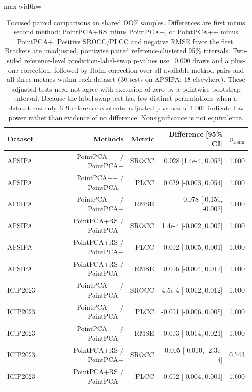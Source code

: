 \documentclass[final,3p,times,twocolumn]{elsarticle}
\begin{document}
\begin{table}[t!]
    \centering
    \caption{Focused paired comparisons on shared OOF samples. Differences are first minus second method: PointPCA+RS minus PointPCA+, or PointPCA++ minus PointPCA+. Positive SROCC/PLCC and negative RMSE favor the first. Brackets are unadjusted, pointwise paired reference-clustered 95\% intervals. Two-sided reference-level prediction-label-swap p-values use 10,000 draws and a plus-one correction, followed by Holm correction over all available method pairs and all three metrics within each dataset (30 tests on APSIPA; 18 elsewhere). These adjusted tests need not agree with exclusion of zero by a pointwise bootstrap interval. Because the label-swap test has few distinct permutations when a dataset has only 6--9 reference contents, adjusted p-values of 1.000 indicate low power rather than evidence of no difference. Nonsignificance is not equivalence.}
    \label{tab_review_pairwise}
    \scriptsize
    \begin{adjustbox}{max width=\textwidth}
        \begin{tabular}{lrrrr}
        \toprule
        Dataset & Methods & Metric & Difference [95\% CI] & $p_{\mathrm{Holm}}$ \\
        \midrule
        APSIPA & PointPCA++ / PointPCA+ & SROCC & 0.028 [1.4e-4, 0.053] & 1.000 \\
        APSIPA & PointPCA++ / PointPCA+ & PLCC & 0.029 [-0.003, 0.054] & 1.000 \\
        APSIPA & PointPCA++ / PointPCA+ & RMSE & -0.078 [-0.150, -0.003] & 1.000 \\
        APSIPA & PointPCA+RS / PointPCA+ & SROCC & 1.4e-4 [-0.002, 0.002] & 1.000 \\
        APSIPA & PointPCA+RS / PointPCA+ & PLCC & -0.002 [-0.005, 0.001] & 1.000 \\
        APSIPA & PointPCA+RS / PointPCA+ & RMSE & 0.006 [-0.004, 0.017] & 1.000 \\
        ICIP2023 & PointPCA++ / PointPCA+ & SROCC & 4.5e-4 [-0.012, 0.012] & 1.000 \\
        ICIP2023 & PointPCA++ / PointPCA+ & PLCC & -0.001 [-0.006, 0.005] & 1.000 \\
        ICIP2023 & PointPCA++ / PointPCA+ & RMSE & 0.003 [-0.014, 0.021] & 1.000 \\
        ICIP2023 & PointPCA+RS / PointPCA+ & SROCC & -0.005 [-0.010, -2.3e-4] & 0.743 \\
        ICIP2023 & PointPCA+RS / PointPCA+ & PLCC & -0.002 [-0.004, 0.001] & 1.000 \\

\end{tabular}
\end{adjustbox}
\end{table}
\end{document}
